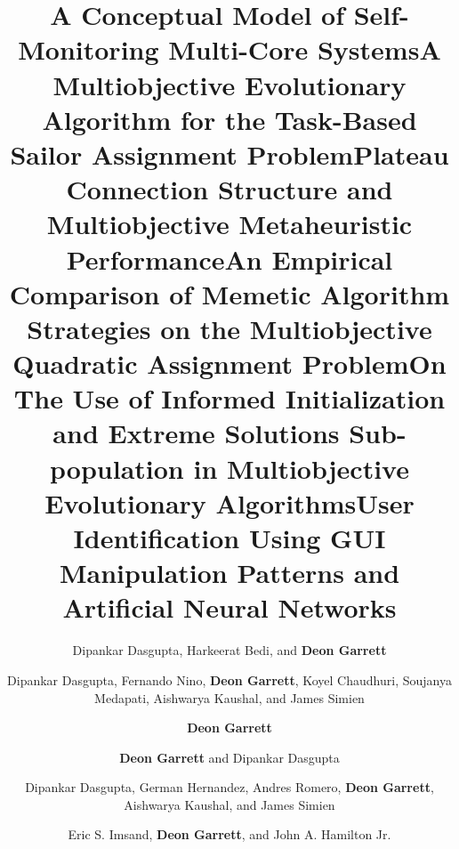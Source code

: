 \documentclass[a4paper,10pt]{cvclean}
\begin{document}
\begin{publications}
\begin{conferencepapers}
\begin{paper}
      \title{A Conceptual Model of Self-Monitoring Multi-Core Systems}
      \author{Dipankar Dasgupta, Harkeerat Bedi, and \textbf{Deon Garrett}}
    \end{paper}
    \begin{paper}
      \title{A Multiobjective Evolutionary Algorithm for the Task-Based Sailor
        Assignment Problem}
      \author{Dipankar Dasgupta, Fernando Nino, \textbf{Deon Garrett}, Koyel Chaudhuri,
        Soujanya Medapati, Aishwarya Kaushal, and James Simien}
    \end{paper}
    \begin{paper}
      \title{Plateau Connection Structure and Multiobjective Metaheuristic
        Performance}
      \author{\textbf{Deon Garrett}}
    \end{paper}
    \begin{paper}
      \title{An Empirical Comparison of Memetic Algorithm Strategies on the
        Multiobjective Quadratic Assignment Problem}
      \author{\textbf{Deon Garrett} and Dipankar Dasgupta}
    \end{paper}
    \begin{paper}
      \title{On The Use of Informed Initialization and Extreme Solutions
        Sub-population in Multiobjective Evolutionary Algorithms}
      \author{Dipankar Dasgupta, German Hernandez, Andres Romero, \textbf{Deon Garrett},
        Aishwarya Kaushal, and James Simien}
    \end{paper}
    \begin{paper}
      \title{User Identification Using GUI Manipulation Patterns and Artificial
        Neural Networks}
      \author{Eric S. Imsand, \textbf{Deon Garrett}, and John A. Hamilton Jr.}

\end{paper}
\end{conferencepapers}
\end{publications}
\end{document}
